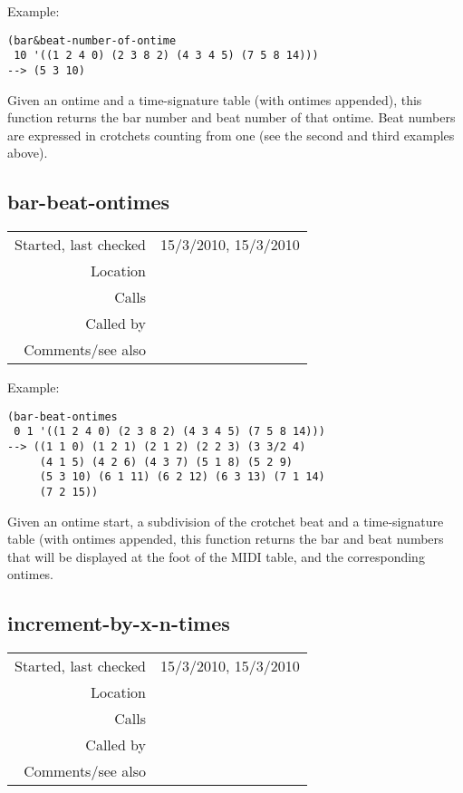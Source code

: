 \vspace{0.5cm}
\noindent Example:
\begin{verbatim}
(bar&beat-number-of-ontime
 10 '((1 2 4 0) (2 3 8 2) (4 3 4 5) (7 5 8 14)))
--> (5 3 10)
\end{verbatim}

\noindent Given an ontime and a time-signature table
(with ontimes appended), this function returns the
bar number and beat number of that ontime. Beat
numbers are expressed in crotchets counting from one
(see the second and third examples above).


\subsection*{bar-beat-ontimes}\label{fun:bar-beat-ontimes}

\vspace{0.3cm}
\begin{tabular}{r|p{8cm}}
Started, last checked & 15/3/2010, 15/3/2010 \\
Location & \nameref{sec:ontimes-signatures} \\
Calls & \nameref{fun:bar-n-beat-number-of-ontime} \\
Called by & \nameref{fun:bar-beat-ontimes} \\
Comments/see also & 
\end{tabular}

\vspace{0.5cm}
\noindent Example:
\begin{verbatim}
(bar-beat-ontimes
 0 1 '((1 2 4 0) (2 3 8 2) (4 3 4 5) (7 5 8 14)))
--> ((1 1 0) (1 2 1) (2 1 2) (2 2 3) (3 3/2 4)
     (4 1 5) (4 2 6) (4 3 7) (5 1 8) (5 2 9)
     (5 3 10) (6 1 11) (6 2 12) (6 3 13) (7 1 14)
     (7 2 15))
\end{verbatim}

\noindent Given an ontime start, a subdivision of
the crotchet beat and a time-signature table (with
ontimes appended, this function returns the bar and
beat numbers that will be displayed at the foot of
the MIDI table, and the corresponding ontimes.


\subsection*{increment-by-x-n-times}\label{fun:increment-by-x-n-times}

\vspace{0.3cm}
\begin{tabular}{r|p{8cm}}
Started, last checked & 15/3/2010, 15/3/2010 \\
Location & \nameref{sec:ontimes-signatures} \\
Calls & \nameref{fun:my-last} \\
Called by & \nameref{fun:bar-beat-ontimes} \\
Comments/see also & 
\end{tabular}

